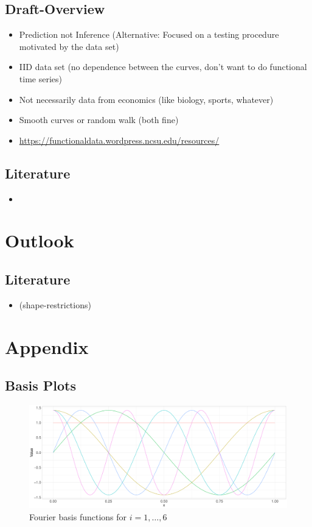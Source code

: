 \documentclass[11pt,twoside,a4paper]{article}
\begin{document}
	\subsection{Draft-Overview}
	\begin{itemize}
		\item Prediction not Inference (Alternative: Focused on a testing procedure motivated by the data set)
		\item IID data set (no dependence between the curves, don't want to do functional time series)
		\item Not necessarily data from economics (like biology, sports, whatever)
		\item Smooth curves or random walk (both fine)
		\item \href{https://functionaldata.wordpress.ncsu.edu/resources/}{https://functionaldata.wordpress.ncsu.edu/resources/}
	\end{itemize}
	
	\subsection{Literature}
	\begin{itemize}
		\item \cite{carey_life_2002}
	\end{itemize}

	\section{Outlook}
	
	\subsection{Literature}
	\begin{itemize}
		\item \cite{James.2009} (shape-restrictions)
	\end{itemize}
	
	\section{Appendix}
	
	\subsection{Basis Plots}
	
	\begin{figure}[H]\label{fourier_basis}
		\includegraphics[width = \textwidth]{../Graphics/Fourier_Basis.pdf}
		\caption{Fourier basis functions for $i = 1,\dots,6$}
	\end{figure}
	
\end{document}

